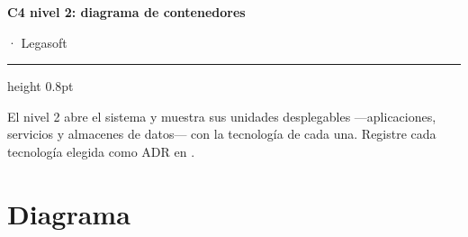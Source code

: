 \documentclass[11pt,a4paper]{article}
\begin{document}
\begin{center}
{\sffamily\bfseries\LARGE\color{lgPrimario} C4 nivel 2: diagrama de contenedores\par}
\vspace{2pt}
{\sffamily\normalsize\color{lgGris}  · Legasoft\par}
\end{center}
\vspace{6pt}
{\color{lgBorde}\hrule height 0.8pt}
\vspace{10pt}

\begin{porcompletar}
El nivel 2 abre el sistema y muestra sus unidades desplegables —aplicaciones,
servicios y almacenes de datos— con la tecnología de cada una. Registre cada
tecnología elegida como ADR en .
\end{porcompletar}

\section*{Diagrama}
\end{document}
